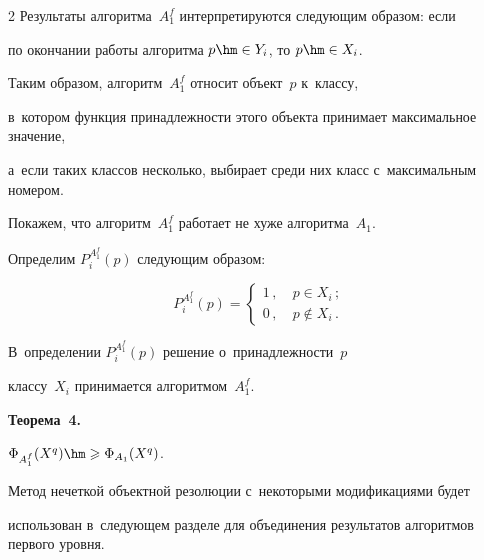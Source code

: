 \begin{multicols}{2}
Результаты алгоритма~$ A_{1}^{f}$ интерпретируются следующим образом: если 


по окончании работы алгоритма $p \hm\in Y_{i}$, то $p \hm\in X_{i}$.





Таким образом, алгоритм~$ A_{1}^{f}$ относит объект~$p$ к~классу, 


в~котором функция принадлежности этого объекта принимает максимальное значение, 


а~если таких классов несколько, выбирает среди них класс с~максимальным номером.





Покажем, что алгоритм~$ A_{1}^{f} $ работает не хуже алгоритма~$A_{1}$.


Определим $ P_{i}^{A_{1}^{f}}(p) $ следующим образом:


$$


 P_{i}^{A_{1}^{f}}(p) = \begin{cases}


1\,, &\ p \in X_{i}\,; \\


0\,, &\ p \notin X_{i}\,.


\end{cases} 


$$





В~определении $ P_{i}^{A_{1}^{f}}(p)$ решение о~принадлеж\-ности~$p$ 


классу~$X_{i}$ принимается алгоритмом~$A_{1}^{f}$.








\smallskip





\noindent


\textbf{Теорема~4.}\


$\Phi_{A_{1}^{f}}(X^{q}) \hm\geqslant \Phi_{A_{1}}(X^{q})$.





\smallskip








Метод нечеткой объектной резолюции с~некоторыми модификациями будет 


использован в~сле\-ду\-ющем разделе для объединения результатов алгоритмов первого уровня.



\end{multicols}
